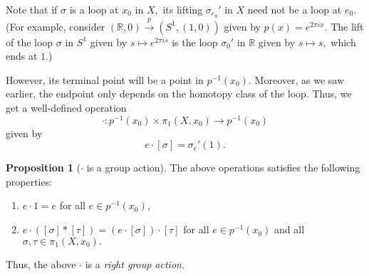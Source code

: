 \documentclass[12pt]{article}
\theoremstyle{definition}
\numberwithin{thm}{section}
\newtheorem{prop}[thm]{Proposition}
\begin{document}
Note that if $\sigma$ is a loop at $x_0$ in $X,$ its lifting $\sigma_{e_0}'$ in $X$ need not be a loop at $e_0.$ (For example, consider $(\mathbb{R}, 0) \overset{p}{\longrightarrow} (S^1, (1, 0))$ given by $p(x) = e^{2\pi ix}.$ The lift of the loop $\sigma$ in $S^1$ given by $s \mapsto e^{2\pi is}$ is the loop $\sigma_0'$ in $\mathbb{R}$ given by $s \mapsto s,$ which ends at $1.$)

However, its terminal point will be a point in $p^{-1}(x_0).$ Moreover, as we saw earlier, the endpoint only depends on the homotopy class of the loop. Thus, we get a well-defined operation
\begin{equation*} 
	\cdot:p^{-1}(x_0) \times \pi_1(X, x_0) \to p^{-1}(x_0)
\end{equation*}
given by
\begin{equation*} 
	e\cdot[\sigma] = \sigma_e'(1).
\end{equation*}
\begin{prop}[$\cdot$ is a group action] \label{prop:dotisgroupact}
	The above operations satisfies the following properties:
	\begin{enumerate}
		\item $e\cdot 1 = e$ for all $e \in p^{-1}(x_0),$
		\item $e\cdot([\sigma]*[\tau]) = (e \cdot [\sigma])\cdot[\tau]$ for all $e \in p^{-1}(x_0)$ and all $\sigma, \tau \in \pi_1(X, x_0).$
	\end{enumerate}
\end{prop}
Thus, the above $\cdot$ is a \emph{right group action.}
\end{document}
